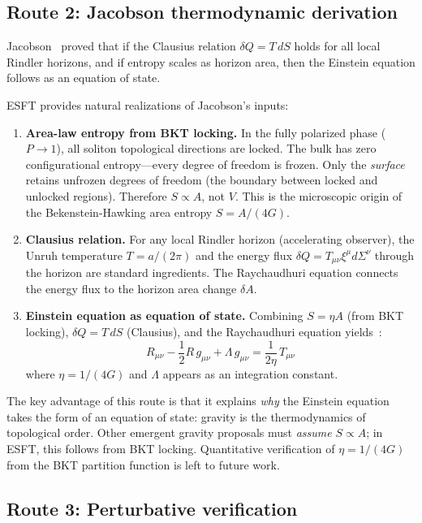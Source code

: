 ﻿\documentclass[twocolumn,preprintnumbers,amsmath,amssymb,prd]{revtex4-2}
\begin{document}
\subsection{Route 2: Jacobson thermodynamic derivation}
\label{sec:jacobson}

Jacobson~\cite{Jacobson1995} proved that if the Clausius relation $\delta Q = T\,dS$ holds for all local Rindler horizons, and if entropy scales as horizon area, then the Einstein equation follows as an equation of state.

ESFT provides natural realizations of Jacobson's inputs:
\begin{enumerate}
\item \textbf{Area-law entropy from BKT locking.} In the fully polarized phase ($P \to 1$), all soliton topological directions are locked. The bulk has zero configurational entropy---every degree of freedom is frozen. Only the \emph{surface} retains unfrozen degrees of freedom (the boundary between locked and unlocked regions). Therefore $S \propto A$, not $V$. This is the microscopic origin of the Bekenstein-Hawking area entropy $S = A/(4G)$.
\item \textbf{Clausius relation.} For any local Rindler horizon (accelerating observer), the Unruh temperature $T = a/(2\pi)$ and the energy flux $\delta Q = T_{\mu\nu}\xi^\mu d\Sigma^\nu$ through the horizon are standard ingredients. The Raychaudhuri equation connects the energy flux to the horizon area change $\delta A$.
\item \textbf{Einstein equation as equation of state.} Combining $S = \eta A$ (from BKT locking), $\delta Q = T\,dS$ (Clausius), and the Raychaudhuri equation yields~\cite{Jacobson1995}:
\begin{equation}
R_{\mu\nu} - \frac{1}{2}R\,g_{\mu\nu} + \Lambda\,g_{\mu\nu} = \frac{1}{2\eta}\,T_{\mu\nu}
\label{eq:jacobson}
\end{equation}
where $\eta = 1/(4G)$ and $\Lambda$ appears as an integration constant.
\end{enumerate}

The key advantage of this route is that it explains \emph{why} the Einstein equation takes the form of an equation of state: gravity is the thermodynamics of topological order. Other emergent gravity proposals must \emph{assume} $S \propto A$; in ESFT, this follows from BKT locking. Quantitative verification of $\eta = 1/(4G)$ from the BKT partition function is left to future work.

\subsection{Route 3: Perturbative verification}
\label{sec:perturbative}
\end{document}
